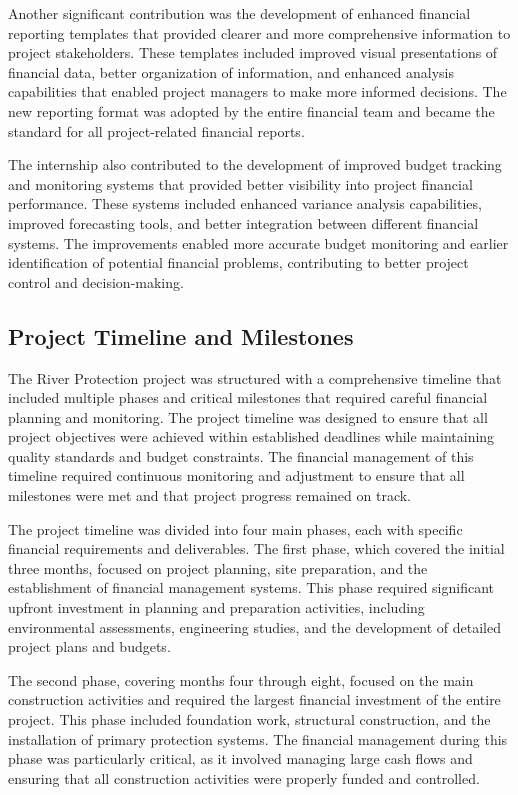 Another significant contribution was the development of enhanced financial reporting templates that provided clearer and more comprehensive information to project stakeholders. These templates included improved visual presentations of financial data, better organization of information, and enhanced analysis capabilities that enabled project managers to make more informed decisions. The new reporting format was adopted by the entire financial team and became the standard for all project-related financial reports.

The internship also contributed to the development of improved budget tracking and monitoring systems that provided better visibility into project financial performance. These systems included enhanced variance analysis capabilities, improved forecasting tools, and better integration between different financial systems. The improvements enabled more accurate budget monitoring and earlier identification of potential financial problems, contributing to better project control and decision-making.

\subsection{Project Timeline and Milestones}
The River Protection project was structured with a comprehensive timeline that included multiple phases and critical milestones that required careful financial planning and monitoring. The project timeline was designed to ensure that all project objectives were achieved within established deadlines while maintaining quality standards and budget constraints. The financial management of this timeline required continuous monitoring and adjustment to ensure that all milestones were met and that project progress remained on track.

The project timeline was divided into four main phases, each with specific financial requirements and deliverables. The first phase, which covered the initial three months, focused on project planning, site preparation, and the establishment of financial management systems. This phase required significant upfront investment in planning and preparation activities, including environmental assessments, engineering studies, and the development of detailed project plans and budgets.

The second phase, covering months four through eight, focused on the main construction activities and required the largest financial investment of the entire project. This phase included foundation work, structural construction, and the installation of primary protection systems. The financial management during this phase was particularly critical, as it involved managing large cash flows and ensuring that all construction activities were properly funded and controlled.


